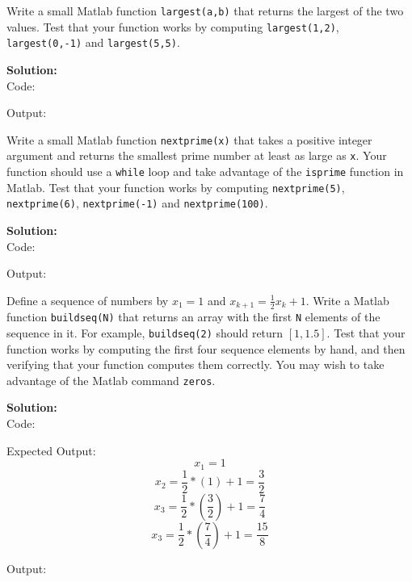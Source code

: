 \documentclass[12pt]{article}
\makeatletter
\theoremstyle{homework}
\newenvironment{exercise}[1]
{\def\@currentlabel{#1}\exercisecore}
{\endexercisecore}
\newcommand{\localhead}[1]{\par\smallskip\noindent\textbf{#1}\nobreak\\}%
\newcommand\solution{\localhead{Solution:}}
\makeatother
\begin{document}
\begin{exercise}{DM 1}
Write a small Matlab function \texttt{largest(a,b)} that
returns the largest of the two values.  Test that your function
works by computing \texttt{largest(1,2)}, \texttt{largest(0,-1)}
and \texttt{largest(5,5)}.
\end{exercise}
\solution
Code:


Output:


\begin{exercise}{DM 2} Write a small Matlab function \texttt{nextprime(x)} 
that takes a positive integer argument and returns the smallest 
prime number at least as large as \texttt{x}.  Your function should
use a \texttt{while} loop and take advantage of the \texttt{isprime}
function in Matlab.  Test that your function works by computing 
\texttt{nextprime(5)}, \texttt{nextprime(6)}, \texttt{nextprime(-1)}
and \texttt{nextprime(100)}.
\end{exercise}
\solution
Code:


Output:


\begin{exercise}{DM 3} Define a sequence of numbers by $x_1=1$ and $x_{k+1}=\frac{1}{2}x_{k} + 1$.  Write a Matlab function \texttt{buildseq(N)} that returns an array
with the first \texttt{N} elements of the sequence in it.  For example,
\texttt{buildseq(2)} should return $[1,1.5]$.  Test that your function
works by computing the first four sequence elements by hand, and then
verifying that your function computes them correctly.  You may wish 
to take advantage of the Matlab command \texttt{zeros}.
\end{exercise}
\solution
Code:



Expected Output: 
\begin{equation*}
	x_1 = 1
\end{equation*}
\begin{equation*}
	x_2 = \frac{1}{2}*(1) + 1 = \frac{3}{2}
\end{equation*}
\begin{equation*}
	x_3 = \frac{1}{2}*(\frac{3}{2}) + 1 = \frac{7}{4}
\end{equation*}
\begin{equation*}
	x_3 = \frac{1}{2}*(\frac{7}{4}) + 1 = \frac{15}{8}
\end{equation*}

Output:

\end{document}

